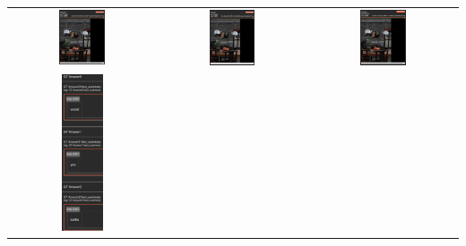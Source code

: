 \documentclass{article}
\begin{document}
\begin{tabular}{ccc}
    \includegraphics[width=0.33\textwidth]{q2.6_5.png} &
    \includegraphics[width=0.33\textwidth]{q2.6_6.png} &
    \includegraphics[width=0.33\textwidth]{q2.6_7.png} \\
    \includegraphics[width=0.3\textwidth]{q2.6_8.png} &

\end{tabular}
\end{document}
